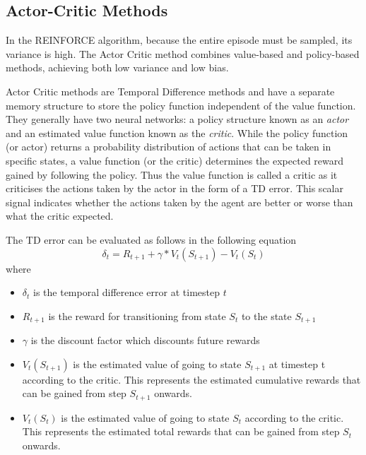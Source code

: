 \documentclass{article}
\begin{document}
\subsection{Actor-Critic Methods}
\par In the REINFORCE algorithm, because the entire episode must be sampled, its variance is high. The Actor Critic method combines value-based and policy-based methods, achieving both low variance and low bias. 
\par Actor Critic methods are Temporal Difference methods and have a separate memory structure to store the policy function independent of the value function. They generally have two neural networks: a policy structure known as an \emph{actor} and an estimated value function known as the \emph{critic}. While the policy function (or actor) returns a probability distribution of actions that can be taken in specific states, a value function (or the critic) determines the expected reward gained by following the policy. Thus the value function is called a critic as it criticises the actions taken by the actor in the form of a TD error. This scalar signal indicates whether the actions taken by the agent are better or worse than what the critic expected. 
\par The TD error can be evaluated as follows in the following equation
\begin{equation*}
\delta_{t} = R_{t+1} + \gamma * V_t(S_{t+1})-V_t(S_t)
\end{equation*}
 where 
\begin{itemize}[itemsep=0pt]
\renewcommand\labelitemi{.}
\item $\delta_{t}$ is the temporal difference error at timestep $t$
\item $R_{t+1}$ is the reward for transitioning from state $S_t$ to the state $S_{t+1}$
\item $\gamma$ is the discount factor which discounts future rewards
\item $V_t(S_{t+1})$ is the estimated value of going to state $S_{t+1}$ at timestep t according to the critic. This represents the estimated cumulative rewards that can be gained from step $S_{t+1}$ onwards.
\item $V_t(S_t)$ is the estimated value of going to state $S_t$ according to the critic. This represents the estimated total rewards that can be gained from step $S_{t}$ onwards.
\end{itemize}
\end{document}
